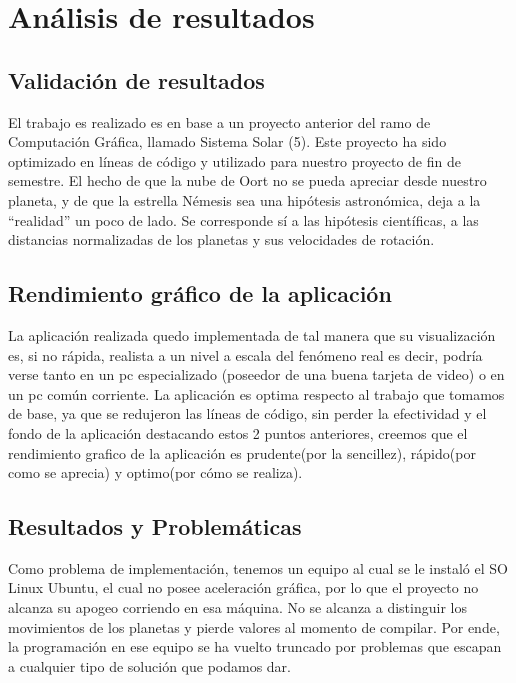 \documentclass[journal]{IEEEtran}
\begin{document}
\section{Análisis de resultados}

\subsection{Validación de resultados}

 El trabajo es realizado es en base a un proyecto anterior del ramo de Computación Gráfica, llamado Sistema Solar (5). Este proyecto ha sido optimizado en líneas de código y utilizado para nuestro proyecto de fin de semestre. El hecho de que la nube de Oort no se pueda apreciar desde nuestro planeta, y de que la estrella Némesis sea una hipótesis astronómica, deja a la “realidad” un poco de lado. Se corresponde sí a las hipótesis científicas, a las distancias normalizadas de los planetas y sus velocidades de rotación.

\subsection{Rendimiento gráfico de la aplicación}

La aplicación realizada quedo implementada de tal manera que su visualización es, si no rápida, realista a un nivel a escala del fenómeno real es decir, podría verse tanto en un pc especializado (poseedor de una buena tarjeta de video) o en un pc común  corriente. La aplicación es optima respecto al trabajo que tomamos de base, ya que se redujeron las líneas de código, sin perder la efectividad y el fondo de la aplicación destacando estos 2 puntos anteriores, creemos que el rendimiento grafico de la aplicación es prudente(por la sencillez), rápido(por como se aprecia) y optimo(por cómo se realiza).

\subsection{Resultados y Problemáticas}

Como problema de implementación, tenemos un equipo al cual se le instaló el SO Linux Ubuntu, el cual no posee aceleración gráfica, por lo que el proyecto no alcanza su apogeo corriendo en esa máquina. No se alcanza a distinguir los movimientos de los planetas y pierde valores al momento de compilar. Por ende, la programación en ese equipo se ha vuelto truncado por problemas que escapan a cualquier tipo de solución que podamos dar. 
\end{document}
